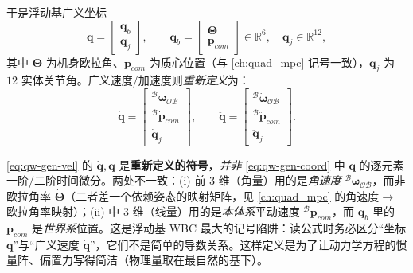 于是浮动基广义坐标
\begin{equation}
  \boldsymbol{q}=\begin{bmatrix}\boldsymbol{q}_b\\\boldsymbol{q}_j\end{bmatrix},\qquad
  \boldsymbol{q}_b=\begin{bmatrix}\boldsymbol{\Theta}\\\boldsymbol{p}_{com}\end{bmatrix}\in\mathbb{R}^6,\quad
  \boldsymbol{q}_j\in\mathbb{R}^{12},
  \label{eq:qw-gen-coord}
\end{equation}
其中 $\boldsymbol{\Theta}$ 为机身欧拉角、$\boldsymbol{p}_{com}$ 为质心位置（与 \cref{ch:quad_mpc} 记号一致），$\boldsymbol{q}_j$ 为 $12$ 实体关节角。广义速度/加速度则\emph{重新定义}为\cite{yu2021quadruped}：
\begin{equation}
  \dot{\boldsymbol{q}}=\begin{bmatrix}{}^{\mathcal{B}}\boldsymbol{\omega}_{\mathcal{OB}}\\{}^{\mathcal{B}}\dot{\boldsymbol{p}}_{com}\\\dot{\boldsymbol{q}}_j\end{bmatrix},
  \qquad
  \ddot{\boldsymbol{q}}=\begin{bmatrix}{}^{\mathcal{B}}\dot{\boldsymbol{\omega}}_{\mathcal{OB}}\\{}^{\mathcal{B}}\ddot{\boldsymbol{p}}_{com}\\\ddot{\boldsymbol{q}}_j\end{bmatrix}.
  \label{eq:qw-gen-vel}
\end{equation}

\begin{note}\label{note:qw-gen-vel}
\cref{eq:qw-gen-vel} 的 $\dot{\boldsymbol{q}},\ddot{\boldsymbol{q}}$ 是\textbf{重新定义的符号}，\emph{并非} \cref{eq:qw-gen-coord} 中 $\boldsymbol{q}$ 的逐元素一阶/二阶时间微分。两处不一致：(i) 前 $3$ 维（角量）用的是\emph{角速度} ${}^{\mathcal{B}}\boldsymbol{\omega}_{\mathcal{OB}}$，而非欧拉角率 $\dot{\boldsymbol{\Theta}}$（二者差一个依赖姿态的映射矩阵，见 \cref{ch:quad_mpc} 的角速度$\to$欧拉角率映射）；(ii) 中 $3$ 维（线量）用的是\emph{本体系}平动速度 ${}^{\mathcal{B}}\dot{\boldsymbol{p}}_{com}$，而 $\boldsymbol{q}_b$ 里的 $\boldsymbol{p}_{com}$ 是\emph{世界系}位置。这是浮动基 WBC 最大的记号陷阱：读公式时务必区分“坐标 $\boldsymbol{q}$”与“广义速度 $\dot{\boldsymbol{q}}$”，它们不是简单的导数关系。这样定义是为了让动力学方程的惯量阵、偏置力写得简洁（物理量取在最自然的基下）。
\end{note}

